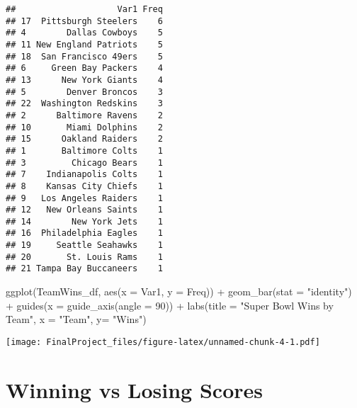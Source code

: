 \documentclass[
]{article}
\newenvironment{Shaded}{\begin{snugshade}}{\end{snugshade}}
\newcommand{\AttributeTok}[1]{\textcolor[rgb]{0.77,0.63,0.00}{#1}}
\newcommand{\DecValTok}[1]{\textcolor[rgb]{0.00,0.00,0.81}{#1}}
\newcommand{\FunctionTok}[1]{\textcolor[rgb]{0.00,0.00,0.00}{#1}}
\newcommand{\NormalTok}[1]{#1}
\newcommand{\OtherTok}[1]{\textcolor[rgb]{0.56,0.35,0.01}{#1}}
\newcommand{\SpecialCharTok}[1]{\textcolor[rgb]{0.00,0.00,0.00}{#1}}
\newcommand{\StringTok}[1]{\textcolor[rgb]{0.31,0.60,0.02}{#1}}
\begin{document}
\begin{Shaded}
\end{Shaded}

\begin{verbatim}
##                    Var1 Freq
## 17  Pittsburgh Steelers    6
## 4        Dallas Cowboys    5
## 11 New England Patriots    5
## 18  San Francisco 49ers    5
## 6     Green Bay Packers    4
## 13      New York Giants    4
## 5        Denver Broncos    3
## 22  Washington Redskins    3
## 2      Baltimore Ravens    2
## 10       Miami Dolphins    2
## 15      Oakland Raiders    2
## 1       Baltimore Colts    1
## 3         Chicago Bears    1
## 7    Indianapolis Colts    1
## 8    Kansas City Chiefs    1
## 9   Los Angeles Raiders    1
## 12   New Orleans Saints    1
## 14        New York Jets    1
## 16  Philadelphia Eagles    1
## 19     Seattle Seahawks    1
## 20       St. Louis Rams    1
## 21 Tampa Bay Buccaneers    1
\end{verbatim}

\begin{Shaded}
\begin{Highlighting}[]
\FunctionTok{ggplot}\NormalTok{(TeamWins\_df, }\FunctionTok{aes}\NormalTok{(}\AttributeTok{x =}\NormalTok{ Var1, }\AttributeTok{y =}\NormalTok{ Freq)) }\SpecialCharTok{+}
  \FunctionTok{geom\_bar}\NormalTok{(}\AttributeTok{stat =} \StringTok{"identity"}\NormalTok{) }\SpecialCharTok{+}
  \FunctionTok{guides}\NormalTok{(}\AttributeTok{x =}  \FunctionTok{guide\_axis}\NormalTok{(}\AttributeTok{angle =} \DecValTok{90}\NormalTok{)) }\SpecialCharTok{+}
  \FunctionTok{labs}\NormalTok{(}\AttributeTok{title =} \StringTok{"Super Bowl Wins by Team"}\NormalTok{,}
        \AttributeTok{x =} \StringTok{"Team"}\NormalTok{,}
        \AttributeTok{y=} \StringTok{"Wins"}\NormalTok{)}
\end{Highlighting}
\end{Shaded}

\texttt{[image: FinalProject\_files/figure-latex/unnamed-chunk-4-1.pdf]}

\hypertarget{winning-vs-losing-scores}{%
\section{Winning vs Losing Scores}\label{winning-vs-losing-scores}}
\end{document}
